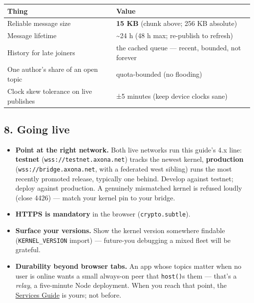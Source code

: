\documentclass[
  nobib]{tufte-handout}
\newcounter{none} %
\providecommand{\tightlist}{%
  \setlength{\itemsep}{0pt}\setlength{\parskip}{0pt}}
\begin{document}
{\def\LTcaptype{none} %
\begin{longtable}[]{@{}
  >{\raggedright\arraybackslash}p{}
  >{\raggedright\arraybackslash}p{}@{}}
\toprule\noalign{}
\begin{minipage}[b]{\linewidth}\raggedright
Thing
\end{minipage} & \begin{minipage}[b]{\linewidth}\raggedright
Value
\end{minipage} \\
\midrule\noalign{}
\endhead
\bottomrule\noalign{}
\endlastfoot
Reliable message size & \textbf{15 KB} (chunk above; 256 KB absolute) \\
Message lifetime & \textasciitilde24 h (48 h max; re-publish to
refresh) \\
History for late joiners & the cached queue --- recent, bounded, not
forever \\
One author's share of an open topic & quota-bounded (no flooding) \\
Clock skew tolerance on live publishes & ±5 minutes (keep device clocks
sane) \\
\end{longtable}
}

\subsection{8. Going live}\label{going-live}

\begin{itemize}
\tightlist
\item
  \textbf{Point at the right network.} Both live networks run this
  guide's 4.x line: \textbf{testnet} (\texttt{wss://testnet.axona.net})
  tracks the newest kernel, \textbf{production}
  (\texttt{wss://bridge.axona.net}, with a federated west sibling) runs
  the most recently promoted release, typically one behind. Develop
  against testnet; deploy against production. A genuinely mismatched
  kernel is refused loudly (close 4426) --- match your kernel pin to
  your bridge.
\item
  \textbf{HTTPS is mandatory} in the browser (\texttt{crypto.subtle}).
\item
  \textbf{Surface your versions.} Show the kernel version somewhere
  findable (\texttt{KERNEL\_VERSION} import) --- future-you debugging a
  mixed fleet will be grateful.
\item
  \textbf{Durability beyond browser tabs.} An app whose topics matter
  when no user is online wants a small always-on peer that
  \texttt{host()}s them --- that's a \emph{relay}, a five-minute Node
  deployment. When you reach that point, the
  \href{Axona-Services-Guide-v4.22.0.md}{Services Guide} is yours; not
  before.
\end{itemize}
\end{document}
